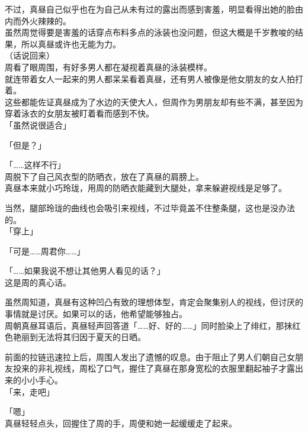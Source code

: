 不过，真昼自己似乎也在为自己从未有过的露出而感到害羞，明显看得出她的脸由内而外火辣辣的。\\

虽然周觉得要是害羞的话穿点布料多点的泳装也没问题，但这大概是千岁教唆的结果，所以真昼或许也无能为力。\\

（话说回来）\\

周看了眼周围，有好多男人都在凝视着真昼的泳装模样。\\

就连带着女人一起来的男人都呆呆看着真昼，还有男人被像是他女朋友的女人拍打着。\\

这些都能佐证真昼成为了水边的天使大人，但周作为男朋友却有些不满，甚至因为穿着泳衣的女朋友被盯着看而感到不快。\\

「虽然说很适合」

「但是？」

「……这样不行」\\

周脱下了自己风衣型的防晒衣，放在了真昼的肩膀上。\\

真昼本来就小巧玲珑，用周的防晒衣能藏到大腿处，拿来躲避视线是足够了。

当然，腿部玲珑的曲线也会吸引来视线，不过毕竟盖不住整条腿，这也是没办法的。\\

「穿上」

「可是……周君你……」

「……如果我说不想让其他男人看见的话？」\\

这是周的真心话。

虽然周知道，真昼有这种凹凸有致的理想体型，肯定会聚集别人的视线，但讨厌的事情就是讨厌。如果可以的话，他希望能够独占。\\

周朝真昼耳语后，真昼轻声回答道「……好、好的……」同时脸染上了绯红，那抹红色艳丽到无法将其归因于夏天的日晒。

前面的拉链迅速拉上后，周围人发出了遗憾的叹息。由于阻止了男人们朝自己女朋友投来的非礼视线，周松了口气，握住了真昼在那身宽松的衣服里翻起袖子才露出来的小小手心。\\

「来，走吧」

「嗯」\\

真昼轻轻点头，回握住了周的手，周便和她一起缓缓走了起来。

